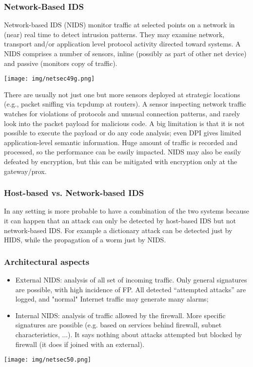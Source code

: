 \documentclass[a4paper, 10pt, titlepage]{article}
\begin{document}
\subsubsection*{Network-Based IDS}
Network-based IDS (NIDS) monitor traffic at selected points on a network in (near) real time to detect intrusion patterns. They may examine network, transport and/or application level protocol activity directed toward systems. A NIDS comprises a number of sensors, inline (possibly as part of other net device) and passive (monitors copy of traffic).
\begin{center}
	\texttt{[image: img/netsec49g.png]}
\end{center}
There are usually not just one but more sensors deployed at strategic locations (e.g., packet sniffing via tcpdump at routers). 
A sensor inspecting network traffic watches for violations of protocols and unusual connection patterns, and rarely look into the packet payload for malicious code. A big limitation is that it is not possible to execute the payload or do any code analysis; even DPI gives limited application-level semantic information. Huge amount of traffic is recorded and processed, so the performance can be easily impacted. NIDS may also be easily defeated by encryption, but this can be mitigated with encryption only at the gateway/prox.

\subsubsection*{Host-based vs. Network-based IDS}
In any setting is more probable to have a combination of the two systems because it can happen that an attack can only be detected by host-based IDS but not network-based IDS. For example a dictionary attack can be detected just by HIDS, while the propagation of a worm just by NIDS. %

\subsubsection*{Architectural aspects}
\begin{itemize}
	\item External NIDS: analysis of all set of incoming traffic. Only general signatures are possible, with high incidence of FP. All detected “attempted attacks” are logged, and "normal" Internet traffic may generate many alarms;
	\item Internal NIDS: analysis of traffic allowed by the firewall. More specific signatures are possible (e.g. based on services behind firewall, subnet characteristics, ...). It says nothing about attacks attempted but blocked by firewall (it does if joined with an external).
\end{itemize}
\begin{center}
	\texttt{[image: img/netsec50.png]}
\end{center}
\end{document}
